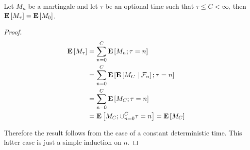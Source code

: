 \begin{lem}Let $M_n$ be a martingale and let $\tau$ be an optional
  time such that $\tau \leq C < \infty$, then $\expectation{M_\tau} =
  \expectation{M_0}$.
\end{lem}
\begin{proof}
\begin{align*}
\expectation{M_\tau} &= \sum_{n=0}^C \expectation{M_n ; \tau=n} \\
&=\sum_{n=0}^C \expectation{\cexpectationlong{\mathcal{F}_n}{M_C} ;
  \tau=n} \\
&=\sum_{n=0}^C \expectation{M_C ;
  \tau=n} \\
&=\expectation{M_C ;
  \cup_{n=0}^C \tau=n} = \expectation{M_C}\\
\end{align*}

Therefore the result follows from the case of a constant deterministic
time.  This latter case is just a simple induction on $n$.
\end{proof}


